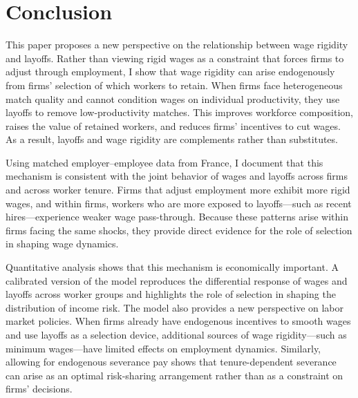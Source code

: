 \documentclass[12pt]{article}
\begin{document}
\begin{titlepage}
\begin{abstract}
\end{abstract}
\end{titlepage}

\newpage








\section{Conclusion}

This paper proposes a new perspective on the relationship between wage rigidity and layoffs. Rather than viewing rigid wages as a constraint that forces firms to adjust through employment, I show that wage rigidity can arise endogenously from firms’ selection of which workers to retain. When firms face heterogeneous match quality and cannot condition wages on individual productivity, they use layoffs to remove low-productivity matches. This improves workforce composition, raises the value of retained workers, and reduces firms’ incentives to cut wages. As a result, layoffs and wage rigidity are complements rather than substitutes.

Using matched employer–employee data from France, I document that this mechanism is consistent with the joint behavior of wages and layoffs across firms and across worker tenure. Firms that adjust employment more exhibit more rigid wages, and within firms, workers who are more exposed to layoffs—such as recent hires—experience weaker wage pass-through. Because these patterns arise within firms facing the same shocks, they provide direct evidence for the role of selection in shaping wage dynamics.

Quantitative analysis shows that this mechanism is economically important. A calibrated version of the model reproduces the differential response of wages and layoffs across worker groups and highlights the role of selection in shaping the distribution of income risk. The model also provides a new perspective on labor market policies. When firms already have endogenous incentives to smooth wages and use layoffs as a selection device, additional sources of wage rigidity—such as minimum wages—have limited effects on employment dynamics. Similarly, allowing for endogenous severance pay shows that tenure-dependent severance can arise as an optimal risk-sharing arrangement rather than as a constraint on firms’ decisions.
\end{document}
